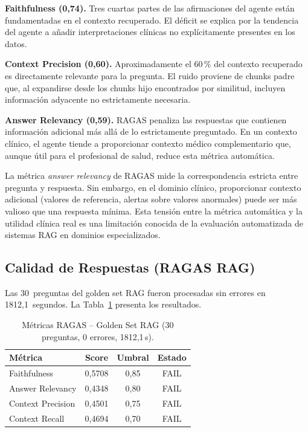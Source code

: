 \documentclass[11pt,a4paper,twocolumn]{article}
\begin{document}
\textbf{Faithfulness (0,74).} Tres cuartas partes de las afirmaciones del agente est\'{a}n fundamentadas en el contexto recuperado. El d\'{e}ficit se explica por la tendencia del agente a a\~{n}adir interpretaciones cl\'{i}nicas no expl\'{i}citamente presentes en los datos.

\textbf{Context Precision (0,60).} Aproximadamente el 60\,\% del contexto recuperado es directamente relevante para la pregunta. El ruido proviene de chunks padre que, al expandirse desde los chunks hijo encontrados por similitud, incluyen informaci\'{o}n adyacente no estrictamente necesaria.

\textbf{Answer Relevancy (0,59).} RAGAS penaliza las respuestas que contienen informaci\'{o}n adicional m\'{a}s all\'{a} de lo estrictamente preguntado. En un contexto cl\'{i}nico, el agente tiende a proporcionar contexto m\'{e}dico complementario que, aunque \'{u}til para el profesional de salud, reduce esta m\'{e}trica autom\'{a}tica.

\begin{tcolorbox}[
  colback=layerbg3, colframe=warning!60,
  title={\footnotesize\bfseries Tensi\'{o}n entre relevancia autom\'{a}tica y utilidad cl\'{i}nica},
  fonttitle=\color{white}, coltitle=white,
  fontupper=\footnotesize, breakable
]
La m\'{e}trica \textit{answer relevancy} de RAGAS mide la correspondencia estricta entre pregunta y respuesta. Sin embargo, en el dominio cl\'{i}nico, proporcionar contexto adicional (valores de referencia, alertas sobre valores anormales) puede ser m\'{a}s valioso que una respuesta m\'{i}nima. Esta tensi\'{o}n entre la m\'{e}trica autom\'{a}tica y la utilidad cl\'{i}nica real es una limitaci\'{o}n conocida de la evaluaci\'{o}n automatizada de sistemas RAG en dominios especializados.
\end{tcolorbox}

\subsection{Calidad de Respuestas (RAGAS RAG)}

Las 30~preguntas del golden set RAG fueron procesadas sin errores en 1812,1~segundos. La Tabla~\ref{tab:ragas_rag} presenta los resultados.

\begin{table}[H]
\centering
\caption{M\'{e}tricas RAGAS -- Golden Set RAG (30 preguntas, 0 errores, 1812,1\,s).}
\label{tab:ragas_rag}
\footnotesize
\begin{tabularx}{\columnwidth}{lccc}
\toprule
\textbf{M\'{e}trica} & \textbf{Score} & \textbf{Umbral} & \textbf{Estado} \\
\midrule
Faithfulness       & 0,5708 & 0,85 & FAIL \\
Answer Relevancy   & 0,4348 & 0,80 & FAIL \\
Context Precision  & 0,4501 & 0,75 & FAIL \\
Context Recall     & 0,4694 & 0,70 & FAIL \\
\bottomrule
\end{tabularx}
\end{table}
\end{document}
